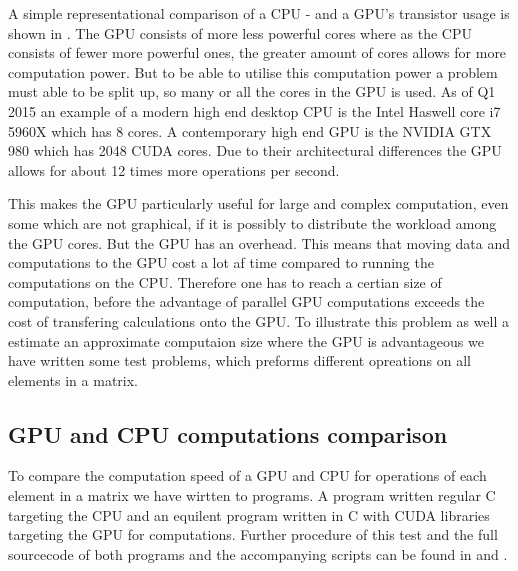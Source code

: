 A simple representational comparison of a CPU - and a GPU's transistor usage is shown in .
The GPU consists of more less powerful cores where as the CPU consists of fewer more powerful ones, the greater amount of cores allows for more computation power.
But to be able to utilise this computation power a problem must able to be split up, so many or all the cores in the GPU is used.
As of Q1 2015 an example of a modern high end desktop CPU is the Intel Haswell core i7 5960X which has 8 cores. \citep{puget}
A contemporary high end GPU is the NVIDIA GTX 980 which has 2048 CUDA cores. \citep{techpowerup,gtx980}
Due to their architectural differences the GPU allows for about 12 times more operations per second.

This makes the GPU particularly useful for large and complex computation, even some which are not graphical, if it is possibly to distribute the workload among the GPU cores.
But the GPU has an overhead.
This means that moving data and computations to the GPU cost a lot af time compared to running the computations on the CPU.
Therefore one has to reach a certian size of computation, before the advantage of parallel GPU computations exceeds the cost of transfering calculations onto the GPU.
To illustrate this problem as well a estimate an approximate computaion size where the GPU is advantageous we have written some test problems, which preforms different opreations on all elements in a matrix. 

\subsection{GPU and CPU computations comparison}
To compare the computation speed of a GPU and CPU for operations of each element in a matrix we have wirtten to programs.
A program written regular C targeting the CPU and an equilent program written in C with CUDA libraries targeting the GPU for computations.
Further procedure of this test and the full sourcecode of both programs and the accompanying scripts can be found in  and .

